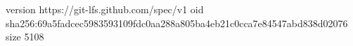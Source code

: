 version https://git-lfs.github.com/spec/v1
oid sha256:69a5fadcec5983593109fdc0aa288a805ba4eb21c0cca7e84547abd838d02076
size 5108
